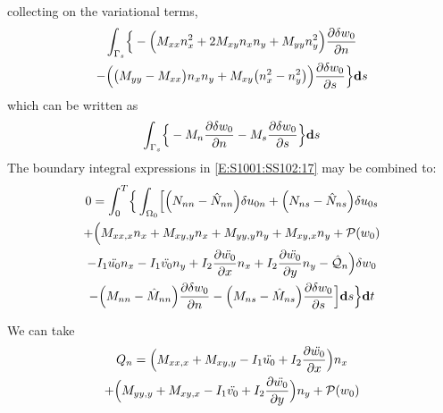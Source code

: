 \documentclass[11pt,letterpaper,titlepage,draft]{article}
\newcommand{\diff}{\textbf d}
\newcommand{\PDer}[2]{\frac{\partial #1}{\partial #2}}
\newcommand{\Vartn}[1]{\delta #1}
\numberwithin{equation}{subsection}
\begin{document}
collecting on the variational terms,
\begin{multline}\label{E:S1001:SS102:22}
\int_{\Gamma_s} \Bigl\{ \Bigr.
  -\Bigl(M_{xx} n_x^2 + 2 M_{xy} n_x n_y + M_{yy} n_y^2 \Bigr) \PDer{\Vartn{w_0}}{n} 
  \\ 
  -\Bigl( \bigl(M_{yy} - M_{xx}\bigr) n_x n_y + M_{xy} \bigl( n_x^2 -  n_y^2 \bigr) \Bigr) \PDer{\Vartn{w_0}}{s} 
  \Bigl.\Bigr\} \diff{s}
\end{multline}
which can be written as
\begin{equation}\label{E:S1001:SS102:23}
\int_{\Gamma_s} \Bigl\{ \Bigr.
  -M_n \PDer{\Vartn{w_0}}{n} - M_s \PDer{\Vartn{w_0}}{s}
  \Bigl.\Bigr\} \diff{s}
\end{equation}
The boundary integral expressions in \ref{E:S1001:SS102:17} may be combined to:
\begin{multline}\label{E:S1001:SS102:24}
        0=\int_0^T\Bigl\{\Bigr.\int_{\Omega_0} \Bigl[\Bigr.
        \Bigl(N_{nn} - \hat{N}_{nn} \Bigr) \Vartn{u_{0n}} + \Bigl( N_{ns} - \hat{N}_{ns} \Bigr) \Vartn{u_{0s}}
\\
        + \Bigl(\Bigr.M_{xx,x} n_x + M_{xy,y} n_x + M_{yy,y} n_y + M_{xy,x} n_y  + \mathcal{P}(w_0) 
\\
      - I_1 \ddot{u_0} n_x - I_1 \ddot{v_0} n_y + I_2 \PDer{\ddot{w_0}}{x} n_x + I_2 \PDer{\ddot{w_0}}{y} n_y - \hat{\mathcal{Q}}_n \Bigl.\Bigr) \Vartn{w_0}
\\
      - \Bigl( M_{nn} - \hat{M}_{nn} \Bigr) \PDer{\Vartn{w_0}}{n} - \Bigl(M_{ns} - \hat{M}_{ns} \Bigr) \PDer{\Vartn{w_0}}{s} \Bigl.\Bigr]\diff{s} \Bigl.\Bigr\} \diff{t}
\end{multline}


We can take 
\begin{multline}\label{E:S1001:SS102:25}
     Q_n = \Bigl( M_{xx,x} + M_{xy,y} - I_1 \ddot{u_0} + I_2 \PDer{\ddot{w_0}}{x} \Bigr) n_x
\\
      + \Bigl( M_{yy,y} + M_{xy,x} - I_1 \ddot{v_0} + I_2 \PDer{\ddot{w_0}}{y} \Bigr) n_y
      + \mathcal{P}(w_0) 
\end{multline}
\end{document}
